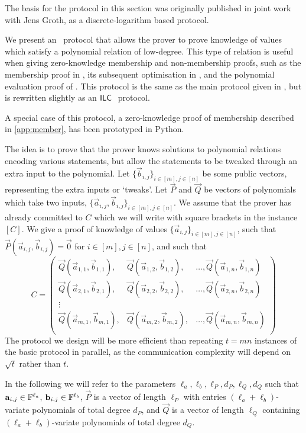 The basis for the protocol in this section was originally published in joint work \cite{BootleG18} with Jens Groth, as a discrete-logarithm based protocol.

We present an \ILC\ protocol that allows the prover to prove knowledge of values which satisfy a polynomial relation of low-degree. This type of relation is useful when giving zero-knowledge membership and non-membership proofs, such as the membership proof in \cite{GrothK15}, its subsequent optimisation in \cite{BootleCCGGP15}, and the polynomial evaluation proof of \cite{BayerG13}. This protocol is the same as the main protocol given in \cite{BootleG18}, but is rewritten slightly as an $\mathsf{ILC}~$ protocol.

A special case of this protocol, a zero-knowledge proof of membership described in \ref{app:member}, has been prototyped in Python.

The idea is to prove that the prover knows solutions to polynomial relations encoding various statements, but allow the statements to be tweaked through an extra input to the polynomial. Let $\lbrace \vec{b}_{i,j} \rbrace_{i\in[m],j\in[n]}$ be some public vectors, representing the extra inputs or `tweaks'. Let $\vec{P}$ and $\vec{Q}$ be vectors of polynomials which take two inputs, $\lbrace \vec{a}_{i,j}, \vec{b}_{i,j} \rbrace_{i\in[m],j\in[n]}$. We assume that the prover has already committed to $C$ which we will write with square brackets in the instance $[C]$. We give a proof of knowledge of values $\lbrace \vec{a}_{i,j} \rbrace_{i\in[m],j\in[n]}$, such that $\vec{P}(\vec{a}_{i,j},\vec{b}_{i,j})=\vec{0}$ for $i \in [m], j \in [n]$, and such that
$$C = \left(\begin{array}{lll}
\vec{Q}(\vec{a}_{1,1},\vec{b}_{1,1}),&\vec{Q}(\vec{a}_{1,2},\vec{b}_{1,2}),& \ldots,\vec{Q}(\vec{a}_{1,n},\vec{b}_{1,n}) \\
\vec{Q}(\vec{a}_{2,1},\vec{b}_{2,1}),&\vec{Q}(\vec{a}_{2,2},\vec{b}_{2,2}),& \ldots,\vec{Q}(\vec{a}_{2,n},\vec{b}_{2,n}) \\
\vdots \\
\vec{Q}(\vec{a}_{m,1},\vec{b}_{m,1}),&\vec{Q}(\vec{a}_{m,2},\vec{b}_{m,2}),& \ldots,\vec{Q}(\vec{a}_{m,n},\vec{b}_{m,n}) \\
\end{array}\right)$$
The protocol we design will be more efficient than repeating $t=mn$ instances of the basic protocol in parallel, as the communication complexity will depend on $\sqrt{t}$ rather than $t$.

In the following we will refer to the parameters $\ell_a,\ell_b,\ell_P,d_P,\ell_Q,d_Q$ such that $\mathbf{a}_{i,j}\in \mathbb{F}^{\ell_a}$, $\mathbf{b}_{i,j}\in \mathbb{F}^{\ell_b}$, $\vec{P}$ is a vector of length $\ell_P$ with entries $(\ell_a+\ell_b)$-variate polynomials of total degree $d_P$, and $\vec{Q}$ is a vector of length $\ell_Q$ containing $(\ell_a+\ell_b)$-variate polynomials of total degree $d_Q$.

